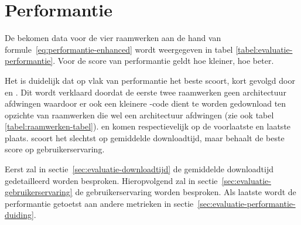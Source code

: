 \section{Performantie}
\label{sec:evaluatie-performantie}
De bekomen data voor de vier raamwerken aan de hand van formule~\ref{eq:performantie-enhanced} wordt weergegeven in tabel \ref{tabel:evaluatie-performantie}.
Voor de score van performantie geldt hoe kleiner, hoe beter.
\begin{table}
\centering
{}
\caption{Overzicht van performantie voor \st{}~(\sta), \kendo{}~(\kendoa), \jqm{}~(\jqma) en \lungo{}~(\lungoa). Minder is beter.}
\label{tabel:evaluatie-performantie}
\end{table}

Het is duidelijk dat op vlak van performantie \lungo{} het beste scoort, kort gevolgd door \jqm{} en \st{}.
Dit wordt verklaard doordat de eerste twee raamwerken geen architectuur afdwingen waardoor er ook een kleinere \js{}-code dient te worden gedownload ten opzichte van raamwerken die wel een architectuur afdwingen (zie ook tabel \ref{tabel:raamwerken-tabel}).
\kendo{} en \st{} komen respectievelijk op de voorlaatste en laatste plaats.
\st{} scoort het slechtst op gemiddelde downloadtijd, maar behaalt de beste score op gebruikerservaring.

Eerst zal in sectie~\ref{sec:evaluatie-downloadtijd} de gemiddelde downloadtijd gedetailleerd worden besproken.
Hieropvolgend zal in sectie~\ref{sec:evaluatie-gebruikerservaring} de gebruikerservaring worden besproken.
Als laatste wordt de performantie getoetst aan andere metrieken in sectie~\ref{sec:evaluatie-performantie-duiding}.


